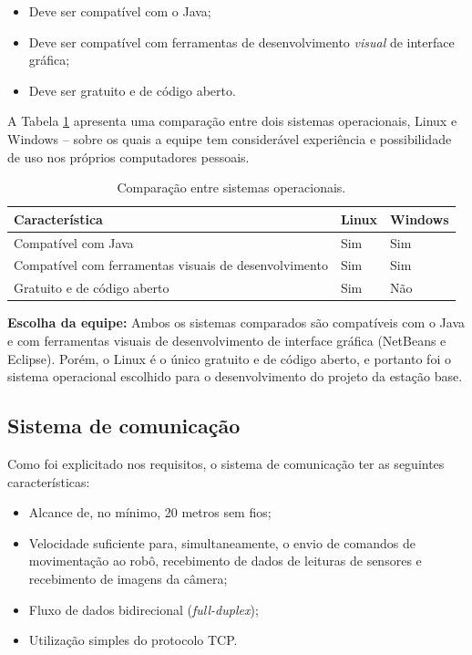 \begin{itemize}
  \item Deve ser compatível com o Java;
  \item Deve ser compatível com ferramentas de desenvolvimento \textit{visual} de interface gráfica;
  \item Deve ser gratuito e de código aberto.
\end{itemize}

A Tabela \ref{tab:alternativas_SO} apresenta uma comparação entre dois sistemas operacionais, Linux e Windows -- sobre os quais a equipe tem considerável experiência e possibilidade de uso nos próprios computadores pessoais.

\begin{table}[h]
  \caption{Comparação entre sistemas operacionais.}
  \centering
  \begin{tabular}{p{6cm}|p{2cm}p{2cm}}
    \toprule
    \textbf{Característica} & \textbf{Linux} & \textbf{Windows} \\
    \hline
    Compatível com Java & Sim & Sim \\
    \hline
    Compatível com ferramentas visuais de desenvolvimento & Sim & Sim \\
    \hline
    Gratuito e de código aberto & Sim & Não \\
    \bottomrule
  \end{tabular}
  \label{tab:alternativas_SO}
\end{table}

\textbf{Escolha da equipe:} Ambos os sistemas comparados são compatíveis com o Java e com ferramentas visuais de desenvolvimento de interface gráfica (NetBeans e Eclipse). Porém, o Linux é o único gratuito e de código aberto, e portanto foi o sistema operacional escolhido para o desenvolvimento do projeto da estação base.



\subsection{Sistema de comunicação}

Como foi explicitado nos requisitos, o sistema de comunicação ter as seguintes características:

\begin{itemize}
  \item Alcance de, no mínimo, 20 metros sem fios;
  \item Velocidade suficiente para, simultaneamente, o envio de comandos de movimentação ao robô, recebimento de dados de leituras de sensores e recebimento de imagens da câmera;
  \item Fluxo de dados bidirecional (\textit{full-duplex});
  \item Utilização simples do protocolo TCP.
\end{itemize}


